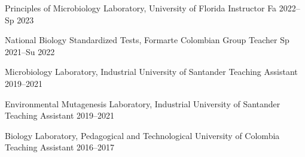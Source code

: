 


\begin{cvhonors}

\cvhonor
{Principles of Microbiology Laboratory, University of Florida}
{Instructor}
{Fa 2022--Sp 2023}

\cvhonor
{National Biology Standardized Tests, Formarte Colombian Group}
{Teacher}
{Sp 2021--Su 2022}

\cvhonor
{Microbiology Laboratory, Industrial University of Santander}
{Teaching Assistant}
{2019--2021}

\cvhonor
{Environmental Mutagenesis Laboratory, Industrial University of Santander}
{Teaching Assistant}
{2019--2021}

\cvhonor
{Biology Laboratory, Pedagogical and Technological University of Colombia}
{Teaching Assistant}
{2016--2017}


\end{cvhonors}








